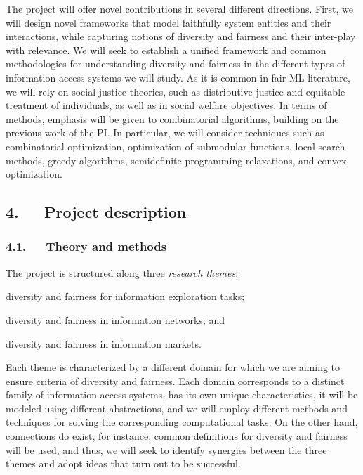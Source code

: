 \documentclass[a4paper,11pt]{article}
\begin{document}
The project will offer novel contributions in several different directions.
First, we will design novel frameworks that model faithfully system entities and their interactions, 
while capturing notions of diversity and fairness and their inter-play with relevance.
We will seek to establish a unified framework and common methodologies for 
understanding diversity and fairness in the different types of information-access systems we will study. 
As it is common in fair ML literature, we will rely on social justice theories, 
such as distributive justice and equitable treatment of individuals, 
as well as in social welfare objectives. 
In terms of methods, emphasis will be given to combinatorial algorithms, building on the previous work of the PI. 
In particular, we will consider techniques 
such as combinatorial optimization, 
optimization of submodular functions, 
local-search methods, 
greedy algorithms, semidefinite-programming relaxations, and convex optimization. 

\subsection*{4.~~~Project description}

\subsubsection*{4.1.~~~Theory and methods}

The project is structured along three {\em research themes}:
\vspace{-1mm}
\begin{description}
\setlength{\itemsep}{-4pt}
\item[{\exploration}\,:] 
diversity and fairness for information exploration tasks;
\item[{\networks}\,:]
diversity and fairness in information networks; and 
\item[{\markets}\,:]
diversity and fairness in information markets.
\end{description}
\vspace{-1mm}
Each theme is characterized by a different domain
for which we are aiming to ensure criteria of diversity and fairness. 
Each domain corresponds to a distinct family of information-access systems, 
has its own unique characteristics, 
it will be modeled using different abstractions, 
and we will employ different methods and techniques for solving the corresponding 
computational tasks. 
On the other hand, connections do exist, 
for instance, common definitions for diversity and fairness will be used, 
and thus, we will seek to identify synergies between the three themes
and adopt ideas that turn out to be successful.
\end{document}
